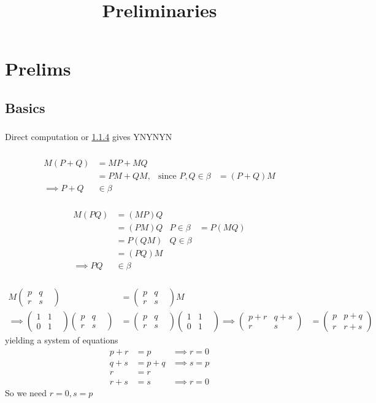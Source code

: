 \documentclass{article}
\title{Preliminaries}
\begin{document}
\vspace{-5em}

\section{Prelims}
\subsection{Basics}
\subsubsection{}
Direct computation or \ref{0p1p4} gives YNYNYN
\subsubsection{}
\begin{align*}
M(P+Q) &= MP + MQ\\
&= PM + QM, & \text{since $P,Q \in \beta$}
&= (P+Q)M\\
\implies P + Q &\in \beta
\end{align*}
\subsubsection{}
\begin{align*}
M(PQ) &= (MP)Q\\
&= (PM)Q & P \in \beta
&=P(MQ)\\
&= P(QM) & Q \in \beta\\
&= (PQ)M\\
\implies PQ &\in \beta
\end{align*}
\subsubsection{}\label{0p1p4}
\newcommand{\betamat}{\begin{pmatrix}1&1&\\0&1\end{pmatrix}}
\newcommand{\pqrs}{\begin{pmatrix}p&q&\\r&s\end{pmatrix}}
\begin{align*}
M\pqrs &= \pqrs M\\
\implies \betamat\pqrs &= \pqrs\betamat
\implies
\begin{pmatrix}
p+r&q+s\\r&s
\end{pmatrix}
&= 
\begin{pmatrix}
p&p+q\\r&r+s
\end{pmatrix}
\end{align*}
yielding a system of equations
\begin{align*}
p+r &=p &\implies r=0\\
q+s &= p+q &\implies s=p\\
r &= r\\
r+s &= s &\implies r = 0
\end{align*}
So we need $r=0, s=p$
\end{document}
